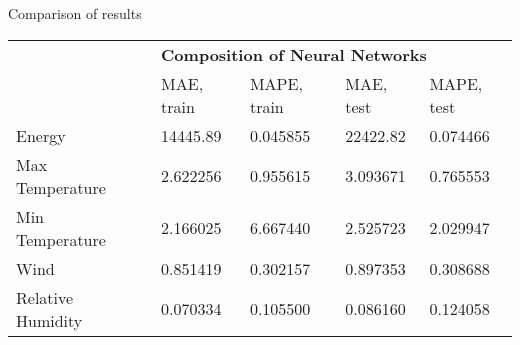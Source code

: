 \documentclass[xcolor=table]{beamer}
\begin{document}
\begin{frame}{Comparison of results}
\footnotesize{
\begin{table}[]
\centering
\label{my-label}
\begin{tabular}{llllll}
                                                                &                       & \multicolumn{4}{l}{\textbf{Composition of Neural Networks}}                                                                                                                                                                           \\ \cline{3-6} 
                                                                & \multicolumn{1}{l|}{} & \multicolumn{1}{l|}{\cellcolor[HTML]{ECF4FF}MAE, train} & \multicolumn{1}{l|}{\cellcolor[HTML]{ECF4FF}MAPE, train} & \multicolumn{1}{l|}{\cellcolor[HTML]{ECF4FF}MAE, test} & \multicolumn{1}{l|}{\cellcolor[HTML]{ECF4FF}MAPE, test} \\ \cline{1-1} \cline{3-6} 
\multicolumn{1}{|l|}{\cellcolor[HTML]{ECF4FF}Energy}            & \multicolumn{1}{l|}{} & \multicolumn{1}{l|}{14445.89}                           & \multicolumn{1}{l|}{0.045855}                            & \multicolumn{1}{l|}{22422.82}                          & \multicolumn{1}{l|}{0.074466}                           \\ \cline{1-1}
\multicolumn{1}{|l|}{\cellcolor[HTML]{ECF4FF}Max Temperature}   & \multicolumn{1}{l|}{} & \multicolumn{1}{l|}{2.622256}                           & \multicolumn{1}{l|}{0.955615}                            & \multicolumn{1}{l|}{3.093671}                          & \multicolumn{1}{l|}{0.765553}                           \\ \cline{1-1}
\multicolumn{1}{|l|}{\cellcolor[HTML]{ECF4FF}Min Temperature}   & \multicolumn{1}{l|}{} & \multicolumn{1}{l|}{2.166025}                           & \multicolumn{1}{l|}{6.667440}                            & \multicolumn{1}{l|}{2.525723}                          & \multicolumn{1}{l|}{2.029947}                           \\ \cline{1-1}
\multicolumn{1}{|l|}{\cellcolor[HTML]{ECF4FF}Wind}              & \multicolumn{1}{l|}{} & \multicolumn{1}{l|}{0.851419}                           & \multicolumn{1}{l|}{0.302157}                            & \multicolumn{1}{l|}{0.897353}                          & \multicolumn{1}{l|}{0.308688}                           \\ \cline{1-1}
\multicolumn{1}{|l|}{\cellcolor[HTML]{ECF4FF}Relative Humidity} & \multicolumn{1}{l|}{} & \multicolumn{1}{l|}{0.070334}                           & \multicolumn{1}{l|}{0.105500}                            & \multicolumn{1}{l|}{0.086160}                          & \multicolumn{1}{l|}{0.124058}                           \\ \cline{1-1}

\end{tabular}
\end{table}}
\end{frame}
\end{document}
